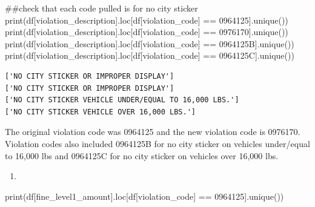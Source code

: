 \documentclass[
]{article}
\newenvironment{Shaded}{\begin{snugshade}}{\end{snugshade}}
\newcommand{\BuiltInTok}[1]{\textcolor[rgb]{0.00,0.23,0.31}{#1}}
\newcommand{\CommentTok}[1]{\textcolor[rgb]{0.37,0.37,0.37}{#1}}
\newcommand{\NormalTok}[1]{\textcolor[rgb]{0.00,0.23,0.31}{#1}}
\newcommand{\OperatorTok}[1]{\textcolor[rgb]{0.37,0.37,0.37}{#1}}
\newcommand{\StringTok}[1]{\textcolor[rgb]{0.13,0.47,0.30}{#1}}
\providecommand{\tightlist}{%
  \setlength{\itemsep}{0pt}\setlength{\parskip}{0pt}}\usepackage{longtable,booktabs,array}
\begin{document}
\begin{Shaded}
\begin{Highlighting}[]
\CommentTok{\#\#check that each code pulled is for no city sticker}
\BuiltInTok{print}\NormalTok{(df[}\StringTok{\textquotesingle{}violation\_description\textquotesingle{}}\NormalTok{].loc[df[}\StringTok{\textquotesingle{}violation\_code\textquotesingle{}}\NormalTok{] }\OperatorTok{==} \StringTok{\textquotesingle{}0964125\textquotesingle{}}\NormalTok{].unique())}
\BuiltInTok{print}\NormalTok{(df[}\StringTok{\textquotesingle{}violation\_description\textquotesingle{}}\NormalTok{].loc[df[}\StringTok{\textquotesingle{}violation\_code\textquotesingle{}}\NormalTok{] }\OperatorTok{==} \StringTok{\textquotesingle{}0976170\textquotesingle{}}\NormalTok{].unique())}
\BuiltInTok{print}\NormalTok{(df[}\StringTok{\textquotesingle{}violation\_description\textquotesingle{}}\NormalTok{].loc[df[}\StringTok{\textquotesingle{}violation\_code\textquotesingle{}}\NormalTok{] }\OperatorTok{==} \StringTok{\textquotesingle{}0964125B\textquotesingle{}}\NormalTok{].unique())}
\BuiltInTok{print}\NormalTok{(df[}\StringTok{\textquotesingle{}violation\_description\textquotesingle{}}\NormalTok{].loc[df[}\StringTok{\textquotesingle{}violation\_code\textquotesingle{}}\NormalTok{] }\OperatorTok{==} \StringTok{\textquotesingle{}0964125C\textquotesingle{}}\NormalTok{].unique())}
\end{Highlighting}
\end{Shaded}

\begin{verbatim}
['NO CITY STICKER OR IMPROPER DISPLAY']
['NO CITY STICKER OR IMPROPER DISPLAY']
['NO CITY STICKER VEHICLE UNDER/EQUAL TO 16,000 LBS.']
['NO CITY STICKER VEHICLE OVER 16,000 LBS.']
\end{verbatim}

The original violation code was 0964125 and the new violation code is
0976170. Violation codes also included 0964125B for no city sticker on
vehicles under/equal to 16,000 lbs and 0964125C for no city sticker on
vehicles over 16,000 lbs.

\begin{enumerate}
\def\labelenumi{\arabic{enumi}.}
\setcounter{enumi}{3}
\tightlist
\item
\end{enumerate}

\begin{Shaded}
\begin{Highlighting}[]
\BuiltInTok{print}\NormalTok{(df[}\StringTok{\textquotesingle{}fine\_level1\_amount\textquotesingle{}}\NormalTok{].loc[df[}\StringTok{\textquotesingle{}violation\_code\textquotesingle{}}\NormalTok{] }\OperatorTok{==} \StringTok{\textquotesingle{}0964125\textquotesingle{}}\NormalTok{].unique())}
\end{Highlighting}
\end{Shaded}
\end{document}
